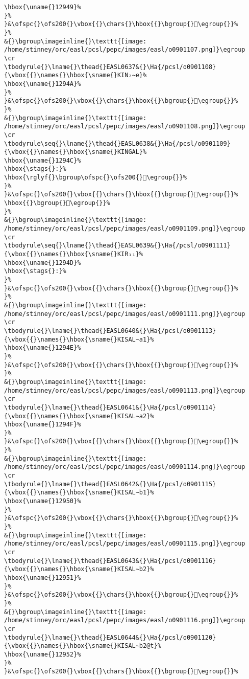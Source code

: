 \begin{verbatim}
\hbox{\uname{}12949}%
}%
}&\ofspc{}\ofs200{}\vbox{{}\chars{}\hbox{{}\bgroup{}𒥉\egroup{}}%
}%
&{}\bgroup\imageinline{}\texttt{[image: /home/stinney/orc/easl/pcsl/pepc/images/easl/o0901107.png]}\egroup
\cr
\tbodyrule{}\lname{}\thead{}EASL0637&{}\Ha{/pcsl/o0901108}{\vbox{{}\names{}\hbox{\sname{}KIN₂∼e}%
\hbox{\uname{}1294A}%
}%
}&\ofspc{}\ofs200{}\vbox{{}\chars{}\hbox{{}\bgroup{}𒥊\egroup{}}%
}%
&{}\bgroup\imageinline{}\texttt{[image: /home/stinney/orc/easl/pcsl/pepc/images/easl/o0901108.png]}\egroup
\cr
\tbodyrule\seq{}\lname{}\thead{}EASL0638&{}\Ha{/pcsl/o0901109}{\vbox{{}\names{}\hbox{\sname{}KINGAL}%
\hbox{\uname{}1294C}%
\hbox{\stags{}:}%
\hbox{\rglyf{}\bgroup\ofspc{}\ofs200{}𒥌\egroup{}}%
}%
}&\ofspc{}\ofs200{}\vbox{{}\chars{}\hbox{{}\bgroup{}𒥋\egroup{}}%
\hbox{{}\bgroup{}𒥌\egroup{}}%
}%
&{}\bgroup\imageinline{}\texttt{[image: /home/stinney/orc/easl/pcsl/pepc/images/easl/o0901109.png]}\egroup
\cr
\tbodyrule\seq{}\lname{}\thead{}EASL0639&{}\Ha{/pcsl/o0901111}{\vbox{{}\names{}\hbox{\sname{}KIR₁₁}%
\hbox{\uname{}1294D}%
\hbox{\stags{}:}%
}%
}&\ofspc{}\ofs200{}\vbox{{}\chars{}\hbox{{}\bgroup{}𒥍\egroup{}}%
}%
&{}\bgroup\imageinline{}\texttt{[image: /home/stinney/orc/easl/pcsl/pepc/images/easl/o0901111.png]}\egroup
\cr
\tbodyrule{}\lname{}\thead{}EASL0640&{}\Ha{/pcsl/o0901113}{\vbox{{}\names{}\hbox{\sname{}KISAL∼a1}%
\hbox{\uname{}1294E}%
}%
}&\ofspc{}\ofs200{}\vbox{{}\chars{}\hbox{{}\bgroup{}𒥎\egroup{}}%
}%
&{}\bgroup\imageinline{}\texttt{[image: /home/stinney/orc/easl/pcsl/pepc/images/easl/o0901113.png]}\egroup
\cr
\tbodyrule{}\lname{}\thead{}EASL0641&{}\Ha{/pcsl/o0901114}{\vbox{{}\names{}\hbox{\sname{}KISAL∼a2}%
\hbox{\uname{}1294F}%
}%
}&\ofspc{}\ofs200{}\vbox{{}\chars{}\hbox{{}\bgroup{}𒥏\egroup{}}%
}%
&{}\bgroup\imageinline{}\texttt{[image: /home/stinney/orc/easl/pcsl/pepc/images/easl/o0901114.png]}\egroup
\cr
\tbodyrule{}\lname{}\thead{}EASL0642&{}\Ha{/pcsl/o0901115}{\vbox{{}\names{}\hbox{\sname{}KISAL∼b1}%
\hbox{\uname{}12950}%
}%
}&\ofspc{}\ofs200{}\vbox{{}\chars{}\hbox{{}\bgroup{}𒥐\egroup{}}%
}%
&{}\bgroup\imageinline{}\texttt{[image: /home/stinney/orc/easl/pcsl/pepc/images/easl/o0901115.png]}\egroup
\cr
\tbodyrule{}\lname{}\thead{}EASL0643&{}\Ha{/pcsl/o0901116}{\vbox{{}\names{}\hbox{\sname{}KISAL∼b2}%
\hbox{\uname{}12951}%
}%
}&\ofspc{}\ofs200{}\vbox{{}\chars{}\hbox{{}\bgroup{}𒥑\egroup{}}%
}%
&{}\bgroup\imageinline{}\texttt{[image: /home/stinney/orc/easl/pcsl/pepc/images/easl/o0901116.png]}\egroup
\cr
\tbodyrule{}\lname{}\thead{}EASL0644&{}\Ha{/pcsl/o0901120}{\vbox{{}\names{}\hbox{\sname{}KISAL∼b2@t}%
\hbox{\uname{}12952}%
}%
}&\ofspc{}\ofs200{}\vbox{{}\chars{}\hbox{{}\bgroup{}𒥒\egroup{}}%

\end{verbatim}
